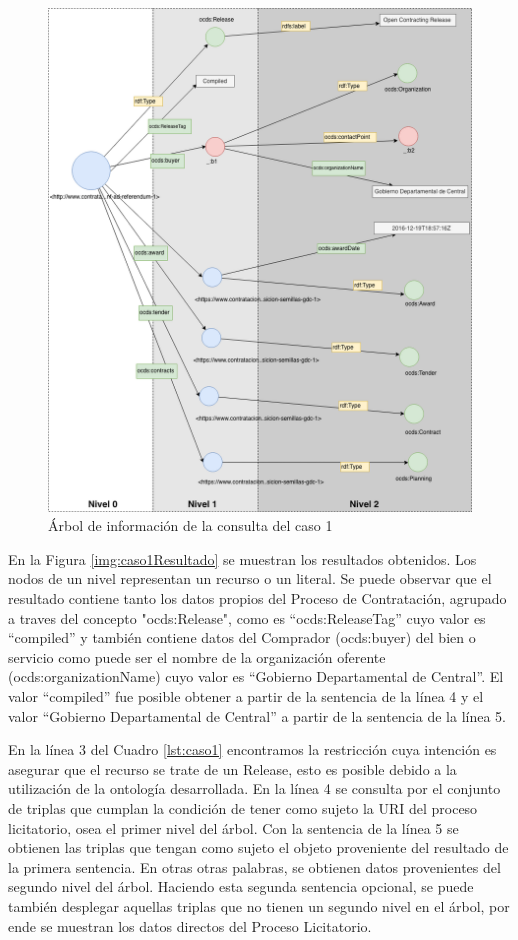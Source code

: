  \begin{figure}[ht!]
    \centering
    \includegraphics[width=150mm]{figuras/Diagramas-Caso1.png}
    \caption{Árbol de información de la consulta del caso 1}
    \label{img:caso1Diagrama}
 \end{figure}

En la Figura \ref{img:caso1Resultado} se muestran los resultados obtenidos. Los nodos de un nivel representan un recurso o un literal. Se puede observar que el resultado contiene tanto los datos propios del Proceso de Contratación, agrupado a traves del concepto "ocds:Release", como es “ocds:ReleaseTag” cuyo valor es “compiled” y también contiene datos del Comprador (ocds:buyer) del bien o servicio como puede ser el nombre de la organización oferente (ocds:organizationName) cuyo valor es “Gobierno Departamental de Central”. El valor “compiled” fue posible obtener a partir de la sentencia de la línea 4 y el valor “Gobierno Departamental de Central” a partir de la sentencia de la línea 5.

En la línea 3 del Cuadro \ref{lst:caso1} encontramos la restricción cuya intención es asegurar que el recurso se trate de un Release, esto es posible debido a la utilización de la ontología desarrollada. En la línea 4 se consulta por el conjunto de triplas que cumplan la condición de tener como sujeto la URI del proceso licitatorio, osea el primer nivel del árbol. Con la sentencia de la línea 5 se obtienen las triplas que tengan como sujeto el objeto proveniente del resultado de la primera sentencia. En otras otras palabras, se obtienen datos provenientes del segundo nivel del árbol. Haciendo esta segunda sentencia opcional, se puede también desplegar aquellas triplas que no tienen un segundo nivel en el árbol, por ende se muestran los datos directos del Proceso Licitatorio.

